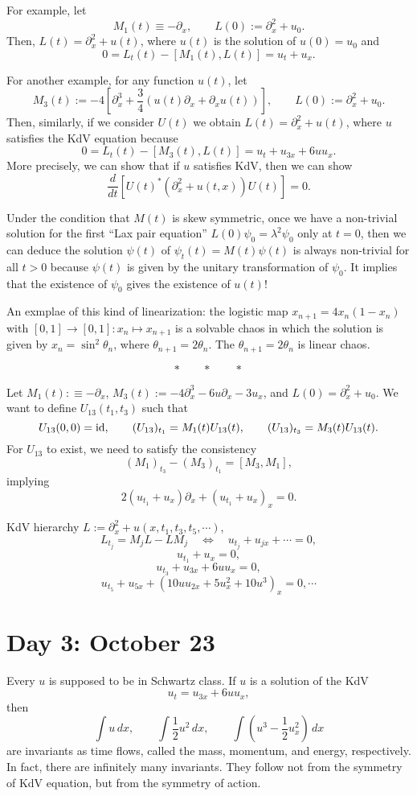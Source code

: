\documentclass{../../../small}
\begin{document}
For example, let
\[M_1(t)\equiv-\partial_x,\qquad L(0):=\partial_x^2+u_0.\]
Then, $L(t)=\partial_x^2+u(t)$, where $u(t)$ is the solution of $u(0)=u_0$ and
\[0=L_t(t)-[M_1(t),L(t)]=u_t+u_x.\]

For another example, for any function $u(t)$, let
\[M_3(t):=-4[\partial_x^3+\frac34(u(t)\partial_x+\partial_xu(t))],\qquad L(0):=\partial_x^2+u_0.\]
Then, similarly, if we consider $U(t)$ we obtain $L(t)=\partial_x^2+u(t)$, where $u$ satisfies the KdV equation because
\[0=L_t(t)-[M_3(t),L(t)]=u_t+u_{3x}+6uu_x.\]
More precisely, we can show that if $u$ satisfies KdV, then we can show
\[\frac d{dt}[U(t)^*(\partial_x^2+u(t,x))U(t)]=0.\]


Under the condition that $M(t)$ is skew symmetric, once we have a non-trivial solution for the first ``Lax pair equation'' $L(0)\psi_0=\lambda^2\psi_0$ only at $t=0$, then we can deduce the solution $\psi(t)$ of $\psi_t(t)=M(t)\psi(t)$ is always non-trivial for all $t>0$ because $\psi(t)$ is given by the unitary transformation of $\psi_0$.
It implies that the existence of $\psi_0$ gives the existence of $u(t)$!

An exmplae of this kind of linearization: the logistic map $x_{n+1}=4x_n(1-x_n)$ with $[0,1]\to[0,1]:x_n\mapsto x_{n+1}$ is a solvable chaos in which the solution is given by $x_n=\sin^2\theta_n$, where $\theta_{n+1}=2\theta_n$.
The $\theta_{n+1}=2\theta_n$ is linear chaos.

\[*\qquad*\qquad*\]
\smallskip

Let $M_1(t):\equiv-\partial_x$, $M_3(t):=-4\partial_x^3-6u\partial_x-3u_x$, and $L(0)=\partial_x^2+u_0$.
We want to define $U_{13}(t_1,t_3)$ such that
\[U_{13}(0,0)=\operatorname{id},\qquad (U_{13})_{t_1}=M_1(t)U_{13}(t),\qquad (U_{13})_{t_3}=M_3(t)U_{13}(t).\]
For $U_{13}$ to exist, we need to satisfy the consistency
\[(M_1)_{t_3}-(M_3)_{t_1}=[M_3,M_1],\]
implying
\[2(u_{t_1}+u_x)\partial_x+(u_{t_1}+u_x)_x=0.\]

KdV hierarchy
$L:=\partial_x^2+u(x,t_1,t_3,t_5,\cdots)$,
\[L_{t_j}=M_jL-LM_j\quad\Leftrightarrow\quad u_{t_j}+u_{jx}+\cdots=0,\]
\[u_{t_1}+u_x=0,\]
\[u_{t_3}+u_{3x}+6uu_x=0,\]
\[u_{t_5}+u_{5x}+(10uu_{2x}+5u_x^2+10u^3)_x=0,\cdots\]



\newpage
\section{Day 3: October 23}

Every $u$ is supposed to be in Schwartz class.
If $u$ is a solution of the KdV
\[u_t=u_{3x}+6uu_x,\]
then
\[\int u\,dx,\qquad\int\frac12u^2\,dx,\qquad\int(u^3-\frac12u_x^2)\,dx\]
are invariants as time flows, called the mass, momentum, and energy, respectively.
In fact, there are infinitely many invariants.
They follow not from the symmetry of KdV equation, but from the symmetry of action.
\end{document}
